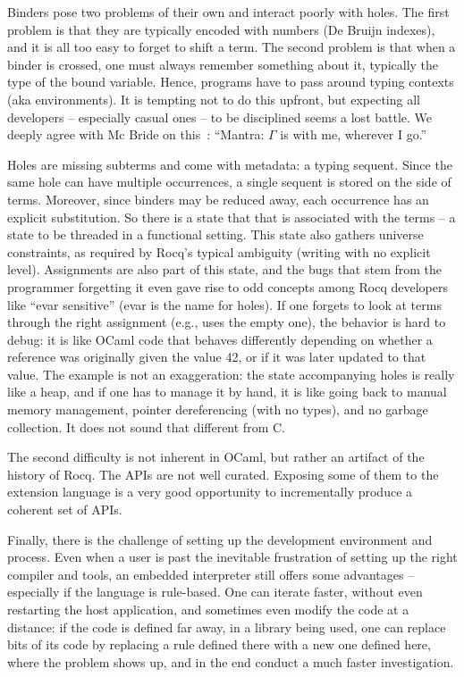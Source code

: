 \documentclass{these-ISSS}
\begin{document}
Binders pose two problems of their own and interact poorly with holes. The
first problem is that they are typically encoded with numbers (De Bruijn
indexes), and it is all too easy to forget to shift a term. The second
problem is that when a binder is crossed, one must always remember something
about it, typically the type of the bound variable. Hence, programs have to
pass around typing contexts (aka environments). It is tempting not to do this
upfront, but expecting all developers -- especially casual ones -- to be disciplined
seems a lost battle. We deeply agree with Mc Bride on this~\cite[page 20]{mcbride}:
``Mantra: $\Gamma$ is with me, wherever I go.''

Holes are missing subterms and come with metadata: a typing sequent. Since the
same hole can have multiple occurrences, a single sequent is stored on the side of
terms. Moreover, since binders may be reduced away, each occurrence has an
explicit substitution. So there is a state that that is associated with the terms --
a state to be threaded in a functional setting. This state also gathers universe
constraints, as required by Rocq's typical ambiguity (writing  with
no explicit level).
Assignments are also part of this state, and the bugs that stem from the
programmer forgetting it even gave rise to odd concepts among Rocq developers
like ``evar sensitive'' (evar is the name for holes). If one forgets to look at
terms through the right assignment (e.g., uses the empty one), the behavior is
hard to debug: it is like OCaml code that behaves differently depending on
whether a reference  was originally given the value 42, or if it was
later updated to that value.
The example is not an exaggeration: the state accompanying holes is really like
a heap, and if one has to manage it by hand, it is like going back to manual
memory management, pointer dereferencing (with no types), and no garbage
collection. It does not sound that different from C.

The second difficulty is not inherent in OCaml, but rather an artifact of the
history of Rocq. The APIs are not well curated. Exposing some of them to the
extension language is a very good opportunity to incrementally produce a
coherent set of APIs.

Finally, there is the challenge of setting up the development environment and
process. Even when a user is past the inevitable frustration of setting up the
right compiler and tools, an embedded interpreter still offers some
advantages -- especially if the language is rule-based. One can iterate faster,
without even restarting the host application, and sometimes even modify the
code at a distance: if the code is defined far away, in a library being used,
one can replace bits of its code by replacing a rule defined there with a
new one defined here, where the problem shows up, and in the end conduct a
much faster investigation.
\end{document}

